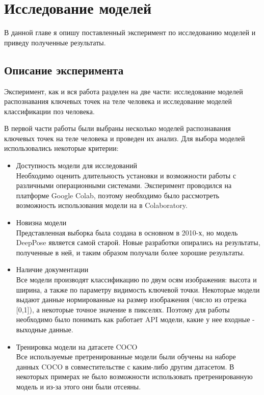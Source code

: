 \section{Исследование моделей}
\label{sec:Chapter4} 

В данной главе я опишу поставленный эксперимент по исследованию моделей и приведу полученные результаты.

\subsection{Описание эксперимента}

Эксперимент, как и вся работа разделен на две части: исследование моделей распознавания ключевых точек на теле человека и исследование моделей классификации поз человека.

В первой части работы были выбраны несколько моделей распознавания ключевых точек на теле человека и проведен их анализ. Для выбора моделей использовались некоторые критерии:

\begin{itemize}
	\item Доступность модели для исследований\\
	Необходимо оценить длительность установки и возможности работы с различными операционными системами. Эксперимент проводился на платформе Google Colab, поэтому необходимо было рассмотреть возможность использования модели на в Colaboratory.
	\item Новизна модели\\
	Представленная выборка была создана в основном в 2010-х, но модель DeepPose является самой старой. Новые разработки опирались на результаты, полученные в ней, и таким образом получали более хорошие результаты.
	\item Наличие документации\\
	Все модели производят классификацию по двум осям изображения: высота и ширина, а также по параметру видимость ключевой точки. Некоторые модели выдают данные нормированные на размер изображения (число из отрезка [0,1]), а некоторые точное значение в пикселях. Поэтому для работы необходимо было понимать как работает API модели, какие у нее входные - выходные данные.
	\item Тренировка модели на датасете COCO\\
	Все используемые претренированные модели были обучены на наборе данных COCO \cite{COCO_topology} в совместительстве с каким-либо другим датасетом. В некоторых  примерах не было возможности использовать претренированную модель и из-за этого они были отсеяны.
\end{itemize}

